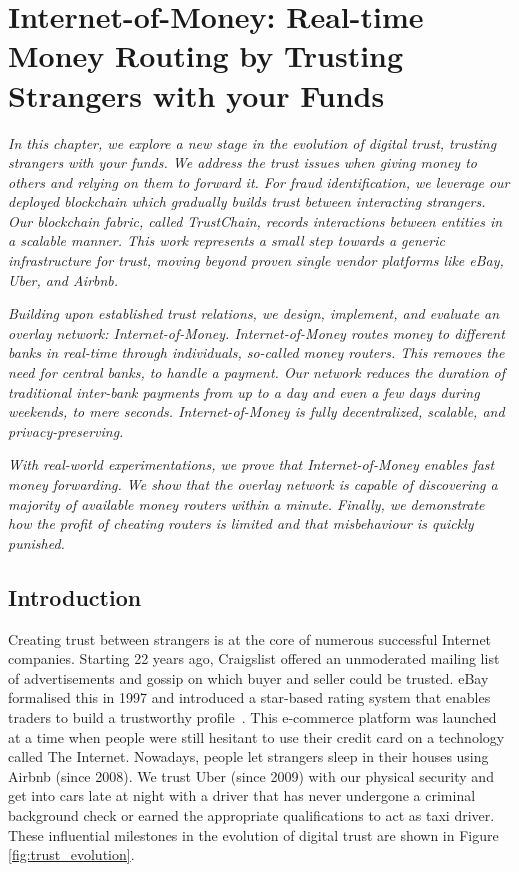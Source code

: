 \chapter{Internet-of-Money: Real-time Money Routing by Trusting Strangers with your Funds}
\label{chapter:iom}

\emph{In this chapter, we explore a new stage in the evolution of digital trust, trusting strangers with your funds.
We address the trust issues when giving money to others and relying on them to forward it.
For fraud identification, we leverage our deployed blockchain which gradually builds trust between interacting strangers.
Our blockchain fabric, called \emph{TrustChain}, records interactions between entities in a scalable manner.
This work represents a small step towards a generic infrastructure for trust, moving beyond proven single vendor platforms like eBay, Uber, and Airbnb.}

\emph{Building upon established trust relations, we design, implement, and evaluate an overlay network: \emph{Internet-of-Money}.
Internet-of-Money routes money to different banks in real-time through individuals, so-called \emph{money routers}.
This removes the need for central banks, to handle a payment.
Our network reduces the duration of traditional inter-bank payments from up to a day and even a few days during weekends, to mere seconds.
Internet-of-Money is fully decentralized, scalable, and privacy-preserving.}

\emph{With real-world experimentations, we prove that Internet-of-Money enables fast money forwarding.
We show that the overlay network is capable of discovering a majority of available money routers within a minute.
Finally, we demonstrate how the profit of cheating routers is limited and that misbehaviour is quickly punished.}

\newpage

\section{Introduction}
Creating trust between strangers is at the core of numerous successful Internet companies.
Starting 22 years ago, Craigslist offered an unmoderated mailing list of advertisements and gossip on which buyer and seller could be trusted.
eBay formalised this in 1997 and introduced a star-based rating system that enables traders to build a trustworthy profile~\cite{resnick2002trust}.
This e-commerce platform was launched at a time when people were still hesitant to use their credit card on a technology called The Internet.
Nowadays, people let strangers sleep in their houses using Airbnb (since 2008).
We trust Uber (since 2009) with our physical security and get into cars late at night with a driver that has never undergone a criminal background check or earned the appropriate qualifications to act as taxi driver.
These influential milestones in the evolution of digital trust are shown in Figure \ref{fig:trust_evolution}.

